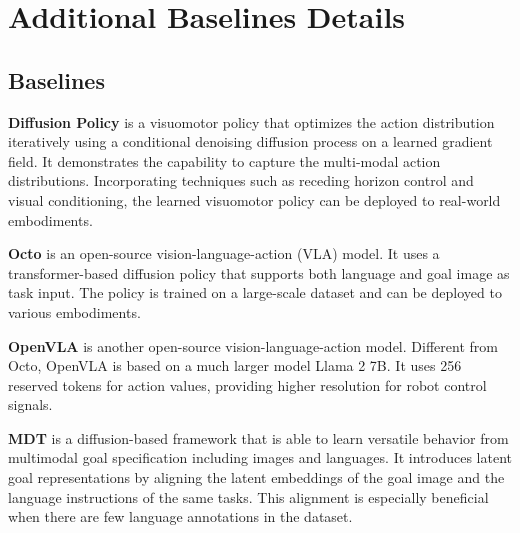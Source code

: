 
% 


% 

\section{Additional Baselines Details}
\subsection{Baselines}
\label{appendix:baselines}

\textbf{Diffusion Policy} \cite{chi2023diffusion} is a visuomotor policy that optimizes the action distribution iteratively using a conditional denoising diffusion process on a learned gradient field. It demonstrates the capability to capture the multi-modal action distributions. Incorporating techniques such as receding horizon control and visual conditioning, the learned visuomotor policy can be deployed to real-world embodiments.


\textbf{Octo} \cite{octo_2023} is an open-source vision-language-action (VLA) model. It uses a transformer-based diffusion policy that supports both language and goal image as task input. The policy is trained on a large-scale dataset and can be deployed to various embodiments.


\textbf{OpenVLA} \cite{kim2024openvlaopensourcevisionlanguageactionmodel}is another open-source vision-language-action model. Different from Octo, OpenVLA is based on a much larger model Llama 2 7B. It uses 256 reserved tokens for action values, providing higher resolution for robot control signals.

\textbf{MDT} \cite{reuss2024multimodaldiffusiontransformerlearning} is a diffusion-based framework that is able to learn versatile behavior from multimodal goal specification including images and languages. It introduces latent goal representations by aligning the latent embeddings of the goal image and the language instructions of the same tasks. This alignment is especially beneficial when there are few language annotations in the dataset. 

